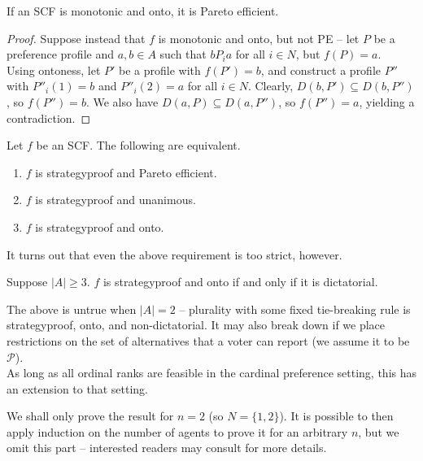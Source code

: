 	\begin{flem}
		If an SCF is monotonic and onto, it is Pareto efficient.
	\end{flem}
	\begin{proof}
		Suppose instead that $f$ is monotonic and onto, but not PE -- let $P$ be a preference profile and $a,b \in A$ such that $b P_i a$ for all $i \in N$, but $f(P) = a$.\\
		Using ontoness, let $P'$ be a profile with $f(P') = b$, and construct a profile $P''$ with $P''_i(1) = b$ and $P''_i(2) = a$ for all $i \in N$. Clearly, $D(b,P') \subseteq D(b,P'')$, so $f(P'') = b$. We also have $D(a,P) \subseteq D(a,P'')$, so $f(P'') = a$, yielding a contradiction.
	\end{proof}

	\begin{fcor}
		Let $f$ be an SCF. The following are equivalent.
		\begin{enumerate}
			\item $f$ is strategyproof and Pareto efficient.
			\item $f$ is strategyproof and unanimous.
			\item $f$ is strategyproof and onto.
		\end{enumerate}
	\end{fcor}

	It turns out that even the above requirement is too strict, however.

	\begin{ftheo}
		\label{theo: GS}
		Suppose $|A| \ge 3$. $f$ is strategyproof and onto if and only if it is dictatorial.
	\end{ftheo}
	The above is untrue when $|A| = 2$ -- plurality with some fixed tie-breaking rule is strategyproof, onto, and non-dictatorial. It may also break down if we place restrictions on the set of alternatives that a voter can report (we assume it to be $\mathcal{P}$).\\
	As long as all ordinal ranks are feasible in the cardinal preference setting, this has an extension to that setting.

	We shall only prove the result for $n = 2$ (so $N = \{1,2\}$). It is possible to then apply induction on the number of agents to prove it for an arbitrary $n$, but we omit this part -- interested readers may consult \cite{gs-theo-sen} for more details.\\

